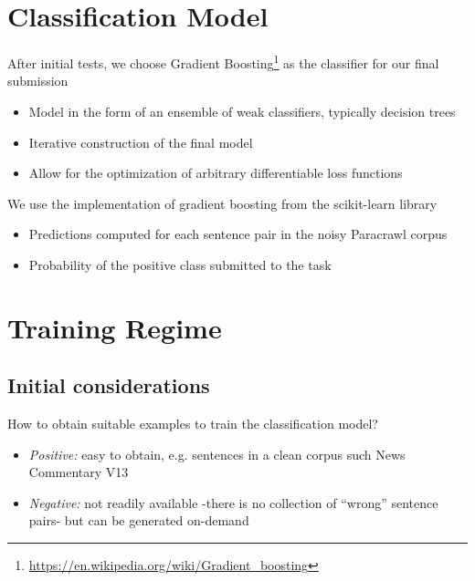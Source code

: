 \documentclass[a0]{sciposter}
\begin{document}
\begin{multicols*}{2}
\section*{\Large Classification Model}
After initial tests, we choose Gradient Boosting\footnote{\url{https://en.wikipedia.org/wiki/Gradient_boosting}} as the classifier for our final submission
\begin{itemize}
  \item Model in the form of an ensemble of weak classifiers, typically decision trees
  \item Iterative construction of the final model
  \item Allow for the optimization of arbitrary differentiable loss functions
\end{itemize}

We use the implementation of gradient boosting from the scikit-learn library %
\begin{itemize}
  \item Predictions computed for each sentence pair in the noisy Paracrawl corpus
  \item Probability of the positive class submitted to the task
\end{itemize}


\section*{\Large Training Regime}
\subsection*{Initial considerations} 
How to obtain suitable examples to train the classification model?
\begin{itemize}
  \item \textit{Positive:} easy to obtain, e.g. sentences in a clean corpus such News Commentary V13
  \item \textit{Negative:} not readily available -there is no collection of ``wrong'' sentence pairs- but can be generated on-demand
\end{itemize}


\end{multicols*}
\end{document}
